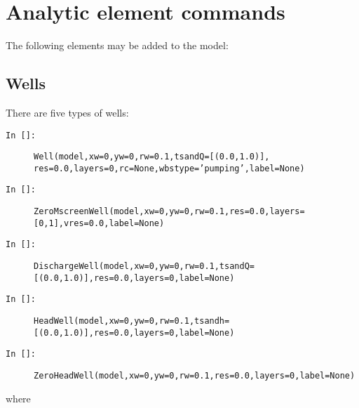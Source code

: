 \documentclass [10pt,letterpaper] {article}
\begin{document}
\clearpage
\section{Analytic element commands}
The following elements may be added to the model:
\subsection{Wells}
There are five types of wells:
\begin{description}
\item[{\tt In []:}] {\tt Well(model,xw=0,yw=0,rw=0.1,tsandQ=[(0.0,1.0)],}\\{\tt res=0.0,layers=0,rc=None,wbstype='pumping',label=None)}
\item[{\tt In []:}] {\tt ZeroMscreenWell(model,xw=0,yw=0,rw=0.1,res=0.0,layers=[0,1],vres=0.0,label=None)}
\item[{\tt In []:}] {\tt DischargeWell(model,xw=0,yw=0,rw=0.1,tsandQ=[(0.0,1.0)],res=0.0,layers=0,label=None)}
\item[{\tt In []:}] {\tt HeadWell(model,xw=0,yw=0,rw=0.1,tsandh=[(0.0,1.0)],res=0.0,layers=0,label=None)}
\item[{\tt In []:}] {\tt ZeroHeadWell(model,xw=0,yw=0,rw=0.1,res=0.0,layers=0,label=None)}

\end{description}
where
\end{document}
